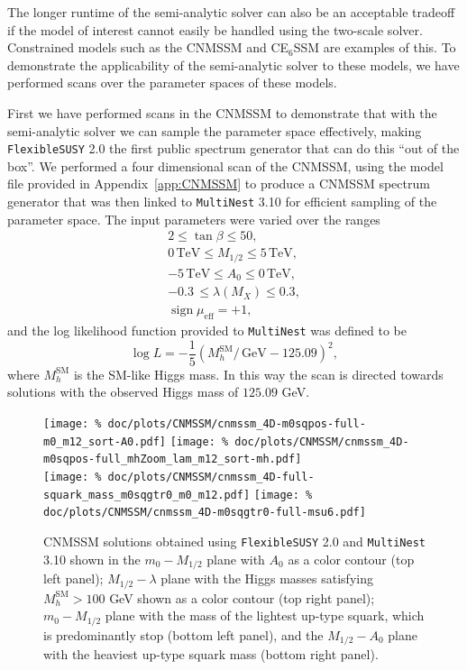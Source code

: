 \documentclass[final,3p,11pt,pdflatex]{elsarticle}
\makeatletter
\newcommand{\fs}{\texttt{FlexibleSUSY}\@\xspace}
\newcommand{\multinest}{\texttt{MultiNest}\@\xspace}
\newcommand{\fstwo}{\fs 2.0\@\xspace}
\newcommand{\ESSM}{E$_6$SSM\@\xspace}
\newcommand{\unit}[1]{\,\text{#1}}      %
\newcommand{\SM}{\ensuremath{\text{SM}}\xspace}
\newcommand{\appref}[1]{Appendix~\ref{#1}}
\newcommand{\azero}{\ensuremath{A_0}\xspace}
\newcommand{\mhalf}{\ensuremath{M_{1/2}}\xspace}
\newcommand{\mzero}{\ensuremath{m_0}\xspace}
\DeclareMathOperator{\sign}{sign}
\makeatother
\begin{document}
The longer runtime of the semi-analytic solver can also be an
acceptable tradeoff if the model of interest cannot easily be
handled using the two-scale solver.  Constrained models such as the
CNMSSM and C\ESSM are examples of this.  To demonstrate the applicability of
the semi-analytic solver to these models, we have performed
scans over the parameter spaces of these models.

First we have performed scans in the CNMSSM to demonstrate that with the
semi-analytic solver we can sample the parameter space effectively, making
\fstwo the first public spectrum generator that can do this ``out of the box''.
We performed a four dimensional scan of the CNMSSM, using the model file
provided in \appref{app:CNMSSM} to produce a CNMSSM spectrum generator that
was then linked to \multinest 3.10 for efficient sampling of the parameter
space.  The input parameters were varied over the ranges
\begin{gather}
  2 \leq \tan \beta \leq 50, \\
  0\unit{TeV} \leq \mhalf \leq 5\unit{TeV}, \\
  -5\unit{TeV} \leq \azero \leq 0\unit{TeV}, \\
  -0.3 \, \leq \lambda(M_X) \leq 0.3, \\
  \sign \mu_{\textrm{eff}}  = +1,
\end{gather}
and the log likelihood function provided to \multinest was defined to be
\begin{equation*}
  \log L = -\frac{1}{5}({M_h^{\SM}}/{\unit{GeV}} - 125.09)^2 ,
\end{equation*}
where $M_h^{\SM}$ is the SM-like Higgs mass.  In this way the scan is directed
towards solutions with the observed Higgs mass of $125.09$ GeV\@.

\begin{figure}[tbh]
  \centering
  \texttt{[image: \%
     doc/plots/CNMSSM/cnmssm\_4D-m0sqpos-full-m0\_m12\_sort-A0.pdf]}
   \texttt{[image: \%
     doc/plots/CNMSSM/cnmssm\_4D-m0sqpos-full\_mhZoom\_lam\_m12\_sort-mh.pdf]} \\
  \texttt{[image: \%
    doc/plots/CNMSSM/cnmssm\_4D-full-squark\_mass\_m0sqgtr0\_m0\_m12.pdf]}
   \texttt{[image: \%
    doc/plots/CNMSSM/cnmssm\_4D-m0sqgtr0-full-msu6.pdf]}
   \caption{CNMSSM solutions obtained using \fstwo and \multinest 3.10 shown in
     the $\mzero-\mhalf$ plane with $\azero$ as a color contour (top left
     panel); $\mhalf-\lambda$ plane with the Higgs masses satisfying
     $M_h^{\SM} > 100$ GeV shown as a color contour (top right
     panel); $\mzero-\mhalf$ plane with the mass of the lightest up-type squark, which is
     predominantly stop (bottom left panel), and the $\mhalf-\azero$ plane with
     the heaviest up-type squark mass (bottom right panel).}
   \label{fig:cnmssm_solutions}
\end{figure}
\end{document}
